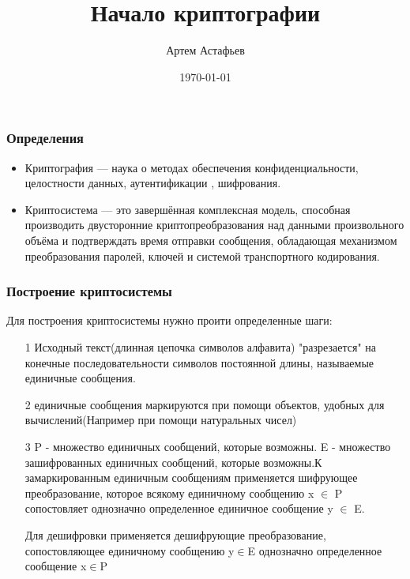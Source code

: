 \documentclass{beamer}
\title{Начало криптографии}
\author{Артем Астафьев}
\institute{ИФМНиИТ|БФУ им.И.Канта}
\date{\today}
\begin{document}
	\begin{frame}
		\titlepage
	\end{frame}


\begin{frame}
	\frametitle{Определения}
	\begin{itemize}
		\item Криптография — наука о методах обеспечения конфиденциальности, целостности данных, аутентификации , шифрования.
		 
		\item Криптосистема — это завершённая комплексная модель, способная производить двусторонние криптопреобразования над данными произвольного объёма и подтверждать время отправки сообщения, обладающая механизмом преобразования паролей, ключей и системой транспортного кодирования. 
		
	\end{itemize}
	
\end{frame}

\begin{frame}
	\frametitle{Построение криптосистемы}
	Для построения криптосистемы нужно проити определенные шаги:
	
	\begin{itemize}
		\item[1] Исходный текст(длинная цепочка символов алфавита) "разрезается" на конечные последовательности символов постоянной длины, называемые единичные сообщения.
		
		\item[2] единичные сообщения маркируются при помощи объектов, удобных для вычислений(Например при помощи натуральных чисел)
		
		\item[3] P - множество единичных сообщений, которые возможны.
		E - множество зашифрованных единичных сообщений, которые возможны.К замаркированным единичным сообщениям применяется шифрующее преобразование, которое всякому единичному сообщению x $\in$ P сопостовляет однозначно определенное единичное сообщение y $\in$ E.
		
		Для дешифровки применяется дешифрующие преобразование, сопостовляющее единичному сообщению y$\in$E однозначно определенное сообщение x$\in$P
		
	\end{itemize}
	
\end{frame}
\end{document}
